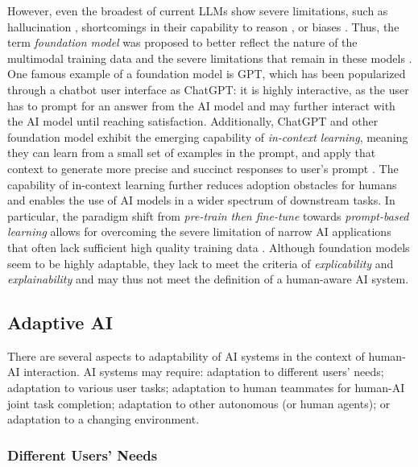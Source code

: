 However, even the broadest of current LLMs show severe limitations, such
as hallucination \citep{jiSurveyHallucinationNatural2023}, shortcomings in their capability to reason 
\citep{bangMultitaskMultilingualMultimodal2023}, or biases \citep{tamkinUnderstandingCapabilitiesLimitations2021}.
Thus, the term \textit{foundation model} was proposed to better reflect the nature of the multimodal training data
and the severe limitations that remain in these models \citep{bommasaniOpportunitiesRisksFoundation2022}. One famous
example of a foundation model is GPT, which has been popularized through a chatbot user interface as ChatGPT: it is
highly interactive, as the user has to prompt for an answer from the AI model and may further interact with the AI
model until reaching satisfaction. Additionally, ChatGPT and other foundation model exhibit the emerging capability
of \textit{in-context learning}, meaning they can learn from a small set of examples in the prompt, and apply that
context to generate more precise and succinct responses to user's prompt \citep{bommasaniOpportunitiesRisksFoundation2022}.
The capability of in-context learning further reduces adoption obstacles for humans and enables the use of AI models
in a wider spectrum of downstream tasks. In particular, the paradigm shift from \textit{pre-train then fine-tune}
towards \textit{prompt-based learning} allows for overcoming the severe limitation of narrow AI applications that
often lack sufficient high quality training data \citep{zhouRevisitingAutomatedPrompting2023}. Although foundation
models seem to be highly adaptable, they lack to meet the criteria of \textit{explicability} and \textit{explainability}
and may thus not meet the definition of a human-aware AI system.

\subsection{Adaptive AI}

There are several aspects to adaptability of AI systems in the context of human-AI interaction. AI systems may
require: adaptation to different users' needs; adaptation to various user tasks; adaptation to human teammates for human-AI
joint task completion; adaptation to other autonomous (or human agents); or adaptation to a changing environment.

\subsubsection{Different Users' Needs}

